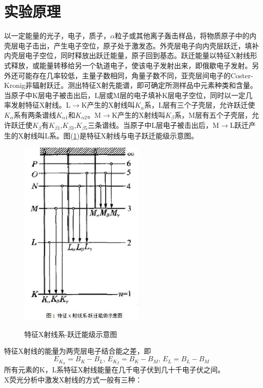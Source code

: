 \documentclass[a4paper]{article}
\begin{document}
\section{实验原理}
以一定能量的光子，电子，质子，$\alpha$粒子或其他离子轰击样品，将物质原子中的内壳层电子击出，产生电子空位，原子处于激发态。外壳层电子向内壳层跃迁，填补内壳层电子空位，同时释放出跃迁能量，原子回到基态。跃迁能量以特征X射线形式释放，或能量转移给另一个轨道电子，使该电子发射出来，即俄歇电子发射。另外还可能存在几率较低，主量子数相同，角量子数不同，亚壳层间电子的Coster-Kronig非辐射跃迁。测出特征X射先能谱，即可确定所测样品中元素种类和含量。\\
当原子中K层电子被击出后，L层或M层的电子填补K层电子空位，同时以一定几率发射特征X射线。L$\to$K产生的X射线叫$K_{\alpha}$系，L层有三个子壳层，允许跃迁使$K_{\alpha}$系有两条谱线$K_{\alpha 1}$和$K_{\alpha 2}$。M$\to$K产生的X射线叫$K_{\beta}$系，M层有五个子壳层，允许跃迁使$K_{\beta}$有$K_{\beta 1}$,$K_{\beta 3}$,$K_{\beta 5}$三条谱线。当原子中L层电子被击出后，M$\to$L跃迁产生的X射线叫L系。图(\ref{Elevel})是特征X射线与电子跃迁能级示意图。
\begin{figure}[!h]
\centering
\includegraphics[width=6cm]{fig/Elevel.jpg}\\
\caption{特征X射线系-跃迁能级示意图}\label{Elevel}
\end{figure}
特征X射线的能量为两壳层电子结合能之差，即
\begin{equation}
E_{K_{\alpha}} = B_K - B_L\text{, }E_{K_{\beta}} = B_K - B_M\text{, }E_L = B_L - B_M
\end{equation}
所有元素的K，L系特征X射线能量在几千电子伏到几十千电子伏之间。\\
X荧光分析中激发X射线的方式一般有三种：
\end{document}

